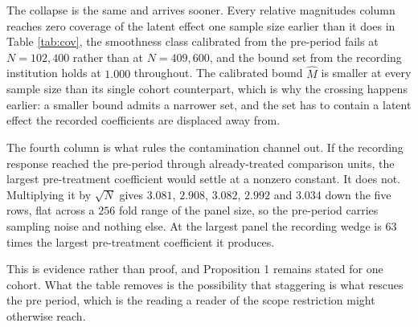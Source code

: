 \documentclass[12pt]{article}
\theoremstyle{definition}
\numberwithin{equation}{section}
\begin{document}
The collapse is the same and arrives sooner. Every relative magnitudes column
reaches zero coverage of the latent effect one sample size earlier than it does
in Table \ref{tab:cov}, the smoothness class calibrated from the pre-period fails at $N = 102{,}400$ rather than at $N = 409{,}600$, and the bound set from
the recording institution holds at $1.000$ throughout. The calibrated bound
$\widehat M$ is smaller at every sample size than its single cohort counterpart,
which is why the crossing happens earlier: a smaller bound admits a narrower
set, and the set has to contain a latent effect the recorded coefficients are
displaced away from.

The fourth column is what rules the contamination channel out. If the recording
response reached the pre-period through already-treated comparison units, the
largest pre-treatment coefficient would settle at a nonzero constant. It does
not. Multiplying it by $\sqrt{N}$ gives $3.081$, $2.908$, $3.082$, $2.992$ and
$3.034$ down the five rows, flat across a $256$ fold range of the panel size, so
the pre-period carries sampling noise and nothing else. At the largest panel the
recording wedge is $63$ times the largest pre-treatment coefficient it produces.

This is evidence rather than proof, and Proposition 1 remains stated
for one cohort. What the table removes is the possibility that staggering is
what rescues the pre period, which is the reading a reader of the scope
restriction might otherwise reach.
\end{document}
